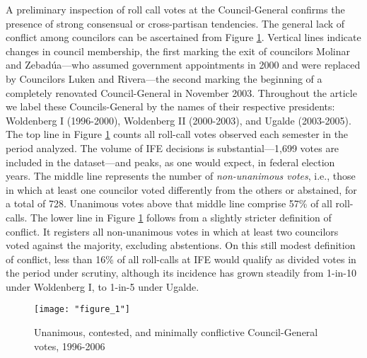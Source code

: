 \documentclass[12 pt, letter]{article}
\begin{document}
A preliminary inspection of roll call votes at the Council-General
confirms the presence of strong consensual or cross-partisan
tendencies.  The general lack of conflict among councilors can be
ascertained from Figure \ref{F:unan}.  Vertical lines indicate
changes in council membership, the first marking the exit of
councilors Molinar and Zebad\'ua---who assumed government
appointments in 2000 and were replaced by Councilors Luken and
Rivera---the second marking the beginning of a completely renovated
Council-General in November 2003.  Throughout the article we label
these Councils-General by the names of their respective presidents:
Woldenberg I (1996-2000), Woldenberg II (2000-2003), and Ugalde
(2003-2005).  The top line in Figure \ref{F:unan} counts all
roll-call votes observed each semester in the period analyzed.  The
volume of IFE decisions is substantial---1,699 votes are included in
the dataset---and peaks, as one would expect, in federal election
years.  The middle line represents the number of \emph{non-unanimous
votes}, i.e., those in which at least one councilor voted
differently from the others or abstained, for a total of 728.
Unanimous votes above that middle line comprise 57\% of all
roll-calls. The lower line in Figure \ref{F:unan} follows from a
slightly stricter definition of conflict.  It registers all
non-unanimous votes in which at least two councilors voted against
the majority, excluding abstentions.  On this still modest
definition of conflict, less than 16\% of all roll-calls at IFE
would qualify as divided votes in the period under scrutiny,
although its incidence has grown steadily from 1-in-10 under
Woldenberg I, to 1-in-5 under Ugalde.

\begin{figure}
\begin{center}
   \caption{Unanimous, contested, and minimally conflictive Council-General votes, 1996-2006}\label{F:unan}
   \texttt{[image: "figure\_1"]}
\end{center}
\end{figure}
\end{document}
